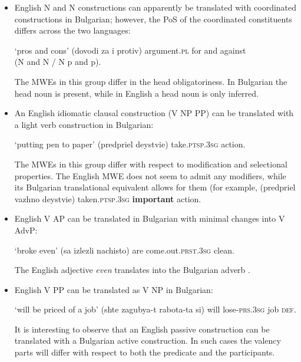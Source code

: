 \documentclass[output=paper]{langsci/langscibook}
\begin{document}
\begin{itemize}
\item English N and N constructions  can apparently be translated with
coordinated constructions in Bulgarian; however, the PoS of the coordinated
constituents differs across the two languages:

\osenovaitem `pros and cons'  \textit{}  (dovodi za i protiv) argument.\textsc{pl} for and against\\(N and N
/ N p and p).

The MWEs in this group differ in the head obligatoriness. In Bulgarian the
head noun is present, while in English a head noun is only inferred.

\item An English idiomatic clausal construction (V NP PP) can be translated
with a light verb construction in Bulgarian:

\osenovaitem  `putting pen to paper'  \textit{}  (predpriel deystvie)  take.\textsc{ptsp.3sg} action.

The MWEs in this group differ with respect to modification and selectional properties. The English MWE does not seem to admit any modifiers, while its
Bulgarian translational equivalent allows for them (for example, \textit{}  (predpriel vazhno deystvie)  taken.\textsc{ptsp.3sg} {\bf important} action.

\item English V AP can be translated in Bulgarian with minimal
changes into V AdvP:
 
\osenovaitem  `broke even' \textit{}  (sa izlezli nachisto)  are come.out.\textsc{prst.3sg} clean.

The  English adjective \textit{even}  translates into the Bulgarian adverb
.

\item English V PP  can be translated as V NP in Bulgarian:

\osenovaitem  `will be priced of a job' \textit{} (shte zagubya-t rabota-ta si) will lose-\textsc{prs.3sg} job \textsc{def}.

It is interesting to observe that an English passive construction  can be
translated with a Bulgarian active construction. In such cases the
valency parts will differ with respect to both the predicate and the
participants.
\end{itemize}
\end{document}
